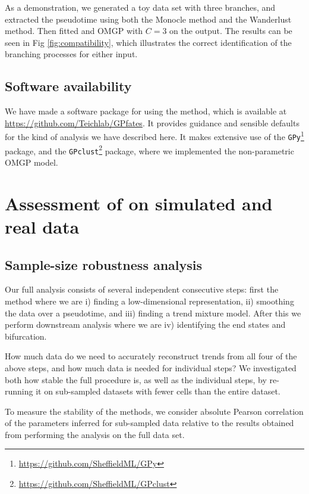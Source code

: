 As a demonstration, we generated a toy data set with three branches, and extracted the pseudotime using both the Monocle method and the Wanderlust method. Then fitted and OMGP with $ C = 3 $ on the output. The results can be seen in Fig \ref{fig:compatibility}, which illustrates the correct identification of the branching processes for either input.

\subsection{Software availability}

We have made a software package for using the  method, which is available at \url{https://github.com/Teichlab/GPfates}. It provides guidance and sensible defaults for the kind of analysis we have described here. It makes extensive use of the \verb|GPy|\footnote{\url{https://github.com/SheffieldML/GPy}} package, and the \verb|GPclust|\footnote{\url{https://github.com/SheffieldML/GPclust}} package, where we implemented the non-parametric OMGP model.

\section{Assessment of  on simulated and real data}

\subsection{Sample-size robustness analysis}

Our full analysis consists of several independent consecutive steps: first the  method where we are i) finding a low-dimensional representation, ii) smoothing the data over a pseudotime, and iii) finding a trend mixture model. After this we perform downstream analysis where we are iv) identifying the end states and bifurcation.

How much data do we need to accurately reconstruct trends from all four of the above steps, and how much data is needed for individual steps? We investigated both how stable the full procedure is, as well as the individual steps, by re-running it on sub-sampled datasets with fewer cells than the entire dataset.

To measure the stability of the methods, we consider absolute Pearson correlation of the parameters inferred for sub-sampled data relative to the results obtained from performing the analysis on the full data set.

